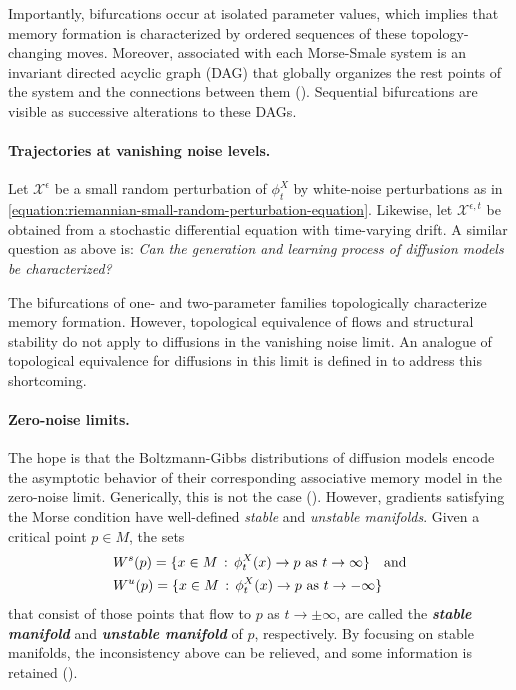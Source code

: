 \documentclass[12pt]{article}
\begin{document}
Importantly, bifurcations occur at isolated parameter values, which implies that memory formation is characterized by ordered sequences of these topology-changing moves. Moreover, associated with each Morse-Smale system is an invariant directed acyclic graph (DAG) that globally organizes the rest points of the system and the connections between them (). Sequential bifurcations are visible as successive alterations to these DAGs.

\paragraph{Trajectories at vanishing noise levels.}
Let $\mathcal{X}^{\epsilon}$ be a small random perturbation of $\phi_t^X$ by white-noise perturbations as in \eqref{equation:riemannian-small-random-perturbation-equation}. Likewise, let $\mathcal{X}^{\epsilon,t}$ be obtained from a stochastic differential equation with time-varying drift. A similar question as above is: \textit{Can the generation and learning process of diffusion models be characterized?}

The bifurcations of one- and two-parameter families topologically characterize memory formation. However, topological equivalence of flows and structural stability do not apply to diffusions in the vanishing noise limit. An analogue of topological equivalence for diffusions in this limit is defined in  to address this shortcoming.

\paragraph{Zero-noise limits.}
The hope is that the Boltzmann-Gibbs distributions of diffusion models encode the asymptotic behavior of their corresponding associative memory model in the zero-noise limit. Generically, this is not the case (). However, gradients satisfying the Morse condition have well-defined \textit{stable} and \textit{unstable manifolds}. Given a critical point $p \in M$, the sets
\begin{align*}
    & W^s(p) = \{x \in M \, : \, \phi^X_t(x) \rightarrow p \textnormal{ as }t \rightarrow \infty \} \hspace{1em} \text{and} \\
    & W^u(p) = \{x \in M \, : \, \phi^X_t(x) \rightarrow p \textnormal{ as }t \rightarrow -\infty \}
\end{align*} 
that consist of those points that flow to $p$ as $t \rightarrow \pm\infty$, are called the \textbf{\textit{stable manifold}} and \textit{\textbf{unstable manifold}} of $p$, respectively. By focusing on stable manifolds, the inconsistency above can be relieved, and some information is retained ().
\end{document}
